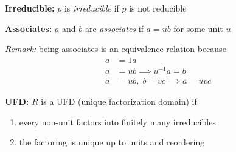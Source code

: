 \documentclass[12pt]{report}
\begin{document}
        \textbf{Irreducible:} $p$ is \emph{irreducible} if $p$ is not reducible
    
        \textbf{Associates:} $a$ and $b$ are \emph{associates} if $a = ub$ for some unit $u$ 

        \emph{Remark:} being associates is an equivalence relation because 
        \begin{align*}
            a &= 1a\\
            a &= ub \implies u^{-1}a = b\\
            a &= ub, \; b = vc \implies a = uvc
        \end{align*}

        \textbf{UFD:} $R$ is a UFD (unique factorization domain) if 
        \begin{enumerate}
            \item every non-unit factors into finitely many irreducibles 
            \item the factoring is unique up to units and reordering
        \end{enumerate}
\end{document}
